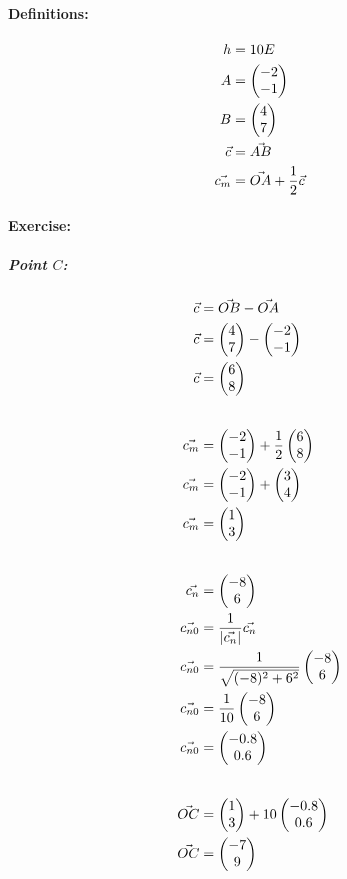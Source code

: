\def\ABhalf{\begin{pmatrix}
    3 \\ 
    4
\end{pmatrix}}

\def\ABmid{\begin{pmatrix}
    1 \\ 
    3
\end{pmatrix}}

\def\ABnorm{\begin{pmatrix}
    -8 \\ 
    6
\end{pmatrix}}

\def\ABnrommag{\sqrt{(-8)^2 + 6^2}}

\def\ABmidzero{\begin{pmatrix}
    -0.8 \\ 
    0.6
\end{pmatrix}}

\def\vOC{\begin{pmatrix}
        -7 \\ 
        9
\end{pmatrix}}

\paragraph{Definitions:}
\begin{align}
    h &= 10 E \\
    A &= \begin{pmatrix} -2 \\ -1 \end{pmatrix} \\
    B &= \begin{pmatrix} 4 \\ 7 \end{pmatrix} \\
    \vec{c} &= \vec{AB} \\
    \vec{c_m} &= \vec{OA} + \frac{1}{2} \vec{c}
\end{align}

\paragraph{Exercise:}
\subparagraph{Point $C$:}
\begin{align}
    \vec{c} &= \vec{OB} - \vec{OA} \\
    \vec{c} &= \B - \A \\
    \vec{c} &= \AB \\[20pt]
    \vec{c_m} &= \A + \frac{1}{2}\AB \\
    \vec{c_m} &= \A  + \ABhalf \\
    \vec{c_m} &= \ABmid \\[20pt]
    \vec{c_n} &= \ABnorm \\
    \vec{c_{n0}} &= \frac{1}{|\vec{c_n}|}\vec{c_n} \\
    \vec{c_{n0}} &= \frac{1}{\ABnrommag}\ABnorm \\
    \vec{c_{n0}} &= \frac{1}{10}\ABnorm \\
    \vec{c_{n0}} &= \ABmidzero \\[20pt]
    \vec{OC} &= \ABmid + \height\ABmidzero \\
    \vec{OC} &= \vOC
\end{align}

